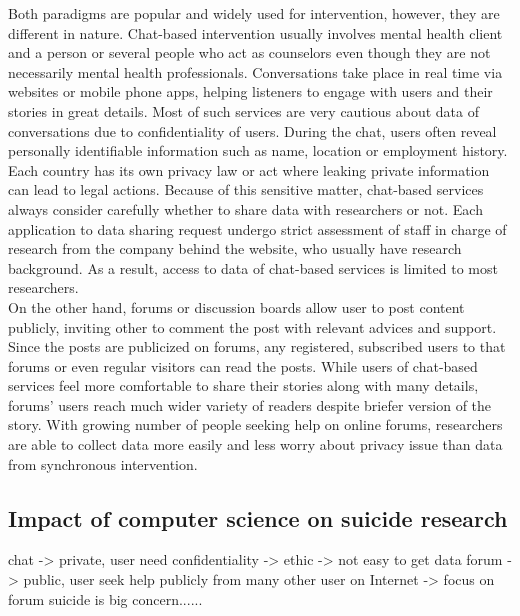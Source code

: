 Both paradigms are popular and widely used for intervention, however, they are different in nature. Chat-based intervention usually involves mental health client and a person or several people who act as counselors even though they are not necessarily mental health professionals. Conversations take place in real time via websites or mobile phone apps, helping listeners to engage with users and their stories in great details. Most of such services are very cautious about data of conversations due to confidentiality of users. During the chat, users often reveal personally identifiable information such as name, location or employment history. Each country has its own privacy law or act where leaking private information can lead to legal actions. Because of this sensitive matter, chat-based services always consider carefully whether to share data with researchers or not. Each application to data sharing request undergo strict assessment of staff in charge of research from the company behind the website, who usually have research background. As a result, access to data of chat-based services is limited to most researchers.\\
On the other hand, forums or discussion boards allow user to post content publicly, inviting other to comment the post with relevant advices and support. Since the posts are publicized on forums, any registered, subscribed users to that forums or even regular visitors can read the posts. While users of chat-based services feel more comfortable to share their stories along with many details, forums' users reach much wider variety of readers despite briefer version of the story. With growing number of people seeking help on online forums, researchers are able to collect data more easily and less worry about privacy issue than data from synchronous intervention.
\subsection*{Impact of computer science on suicide research}

chat -> private, user need confidentiality -> ethic -> not easy to get data
forum -> public, user seek help publicly from many other user on Internet -> focus on forum
suicide is big concern......




